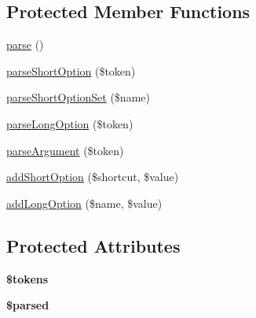 \subsection*{Protected Member Functions}
\begin{DoxyCompactItemize}
\item 
\hyperlink{class_symfony_1_1_components_1_1_console_1_1_input_1_1_argv_input_a38d99acc70a1d8fd8f94455743b2d237}{parse} ()
\item 
\hyperlink{class_symfony_1_1_components_1_1_console_1_1_input_1_1_argv_input_a3c01732860bd9ae6217ec2e1870e00fd}{parseShortOption} (\$token)
\item 
\hyperlink{class_symfony_1_1_components_1_1_console_1_1_input_1_1_argv_input_a9ad982c2161431cfc3ae0d3396e310ce}{parseShortOptionSet} (\$name)
\item 
\hyperlink{class_symfony_1_1_components_1_1_console_1_1_input_1_1_argv_input_ad577fbade94b435028ae463707df0a0b}{parseLongOption} (\$token)
\item 
\hyperlink{class_symfony_1_1_components_1_1_console_1_1_input_1_1_argv_input_a497f1014327bfbc138b4c4e7f1852106}{parseArgument} (\$token)
\item 
\hyperlink{class_symfony_1_1_components_1_1_console_1_1_input_1_1_argv_input_a7c82bd001b1072d631bc9f692e6522ef}{addShortOption} (\$shortcut, \$value)
\item 
\hyperlink{class_symfony_1_1_components_1_1_console_1_1_input_1_1_argv_input_aa82dc00580e8f0388fff7e987c2b4aa8}{addLongOption} (\$name, \$value)
\end{DoxyCompactItemize}
\subsection*{Protected Attributes}
\begin{DoxyCompactItemize}
\item 
\hypertarget{class_symfony_1_1_components_1_1_console_1_1_input_1_1_argv_input_a72ead29e4317fbc4335fd3ba764e8b59}{
{\bfseries \$tokens}}
\label{class_symfony_1_1_components_1_1_console_1_1_input_1_1_argv_input_a72ead29e4317fbc4335fd3ba764e8b59}

\item 
\hypertarget{class_symfony_1_1_components_1_1_console_1_1_input_1_1_argv_input_a88925ebaf6173a1412197d8134d0a0a6}{
{\bfseries \$parsed}}
\label{class_symfony_1_1_components_1_1_console_1_1_input_1_1_argv_input_a88925ebaf6173a1412197d8134d0a0a6}

\end{DoxyCompactItemize}


